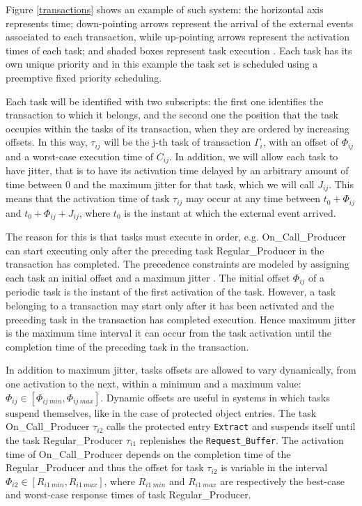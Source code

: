 \documentclass{article}
\begin{document}
Figure \ref{transactions} shows an example of such system: the horizontal axis represents time; down-pointing arrows represent the arrival of the external events associated to each transaction, while up-pointing arrows represent the activation times of each task; and shaded boxes represent task execution \cite{pessimistic-rma}. Each task has its own unique priority and in this example the task set is scheduled using a preemptive fixed priority scheduling.

Each task will be identified with two subscripts: the first one identifies the transaction to which it belongs, and the second one the position that the task occupies within the tasks of its transaction, when they are ordered by increasing offsets. In this way, $\tau_{ij}$ will be the j-th task of transaction $\Gamma_i$, with an offset of $\Phi_{ij}$ and a worst-case execution time of $C_{ij}$. In addition, we will allow each task to have jitter, that is to have its activation time delayed by an arbitrary amount of time between 0 and the maximum jitter for that task, which we will call $J_{ij}$. This means that the activation time of task $\tau_{ij}$ may occur at any time between $t_0 + \Phi_{ij}$ and $t_0 + \Phi_{ij} + J_{ij}$, where $t_0$ is the instant at which the external event arrived.

The reason for this is that tasks must execute in order, e.g. On\_Call\_Producer can start executing only after the preceding task Regular\_Producer in the transaction has completed. The precedence constraints are modeled by assigning each task an initial offset and a maximum jitter \cite{tindell-offsets}. The initial offset $\Phi_{ij}$ of a periodic task is the instant of the first activation of the task. However, a task belonging to a transaction may start only after it has been activated and the preceding task in the transaction has completed execution. Hence maximum jitter is the maximum time interval it can occur from the task activation until the completion time of the preceding task in the transaction.

In addition to maximum jitter, tasks offsets are allowed to vary dynamically, from one activation to the next, within a minimum and a maximum value: $\Phi_{ij} \in [\Phi_{ij\ min}, \Phi_{ij\ max}]$. Dynamic offsets are useful in systems in which tasks suspend themselves, like in the case of protected object entries. The task On\_Call\_Producer $\tau_{i2}$ calls the protected entry \texttt{Extract} and suspends itself until the task Regular\_Producer $\tau_{i1}$ replenishes the \texttt{Request\_Buffer}. The activation time of On\_Call\_Producer depends on the completion time of the Regular\_Producer and thus the offset for task $\tau_{i2}$ is variable in the interval $\Phi_{i2} \in [R_{i1\ min}, R_{i1\ max}]$, where $R_{i1\ min}$ and $R_{i1\ max}$ are respectively the best-case and worst-case response times of task Regular\_Producer.
\end{document}
